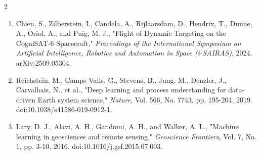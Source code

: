 \documentclass[fleqn,10pt,letterpaper]{article}
\begin{document}
\begin{multicols}{2}
\begin{enumerate}
\item Chien, S., Zilberstein, I., Candela, A., Rijlaarsdam, D., Hendrix, T., Dunne, A., Oriol, A., and Puig, M. J., "Flight of Dynamic Targeting on the CogniSAT-6 Spacecraft," \emph{Proceedings of the International Symposium on Artificial Intelligence, Robotics and Automation in Space (i-SAIRAS)}, 2024. arXiv:2509.05304.
\item Reichstein, M., Camps-Valls, G., Stevens, B., Jung, M., Denzler, J., Carvalhais, N., et al., "Deep learning and process understanding for data-driven Earth system science," \emph{Nature}, Vol. 566, No. 7743, pp. 195-204, 2019. doi:10.1038/s41586-019-0912-1.
\item Lary, D. J., Alavi, A. H., Gandomi, A. H., and Walker, A. L., "Machine learning in geosciences and remote sensing," \emph{Geoscience Frontiers}, Vol. 7, No. 1, pp. 3-10, 2016. doi:10.1016/j.gsf.2015.07.003.
\end{enumerate}

\end{multicols}
\end{document}
